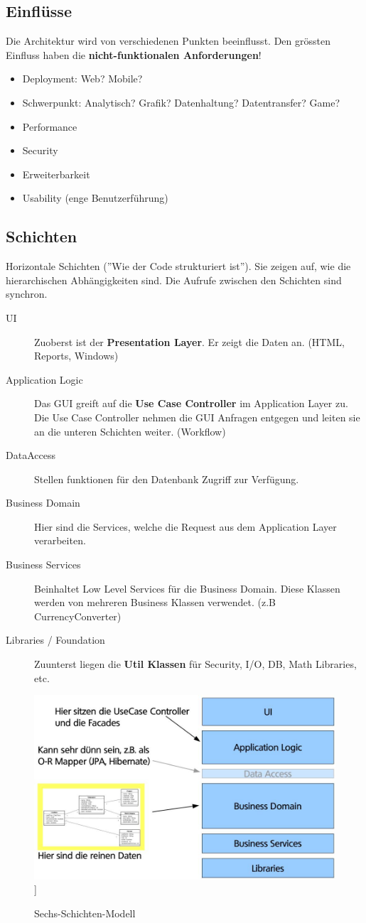\subsection{Einflüsse}
Die Architektur wird von verschiedenen Punkten beeinflusst. Den grössten Einfluss haben die \textbf{nicht-funktionalen Anforderungen}!
\begin{itemize}
	\item Deployment: Web? Mobile?
	\item Schwerpunkt: Analytisch? Grafik? Datenhaltung? Datentransfer? Game? 
	\item Performance
	\item Security
	\item Erweiterbarkeit
	\item Usability (enge Benutzerführung)
\end{itemize}


\subsection{Schichten}
Horizontale Schichten (''Wie der Code strukturiert ist''). Sie zeigen auf, wie die hierarchischen Abhängigkeiten sind. Die Aufrufe zwischen den Schichten sind synchron.
\begin{description}
	\item[UI] Zuoberst ist der \textbf{Presentation Layer}. Er zeigt die Daten an. (HTML, Reports, Windows)
	\item[Application Logic] Das GUI greift auf die \textbf{Use Case Controller} im Application Layer zu. Die Use Case Controller nehmen die GUI Anfragen entgegen und leiten sie an die unteren Schichten weiter. (Workflow)
	\item[DataAccess] Stellen funktionen für den Datenbank Zugriff zur Verfügung.
	\item[Business Domain] Hier sind die Services, welche die Request aus dem Application Layer verarbeiten.
	\item[Business Services] Beinhaltet Low Level Services für die Business Domain. Diese Klassen werden von mehreren Business Klassen verwendet. (z.B CurrencyConverter)
	\item[Libraries / Foundation] Zuunterst liegen die \textbf{Util Klassen} für Security, I/O, DB, Math Libraries, etc.
\end{description}

\begin{figure}[h]
	\centering
	\includegraphics[width=0.7\linewidth]{images/architektur_layermodell}]
	\caption{Sechs-Schichten-Modell}
	\label{fig:architekturlayermodell}
\end{figure}


